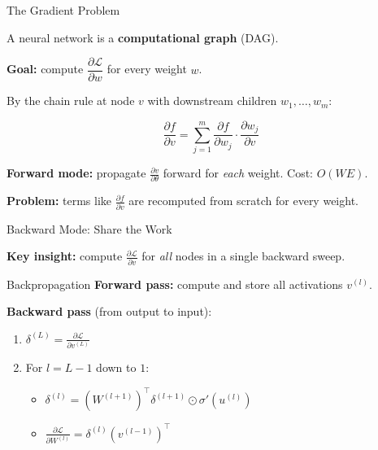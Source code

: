 \documentclass[aspectratio=169, professionalfonts]{beamer}
\begin{document}
\begin{frame}{The Gradient Problem}

A neural network is a \textbf{computational graph} (DAG).

\bigskip

\textbf{Goal:} compute $\dfrac{\partial\mathcal{L}}{\partial w}$
for every weight $w$.

\bigskip

By the chain rule at node $v$ with downstream children $w_1,\dots,w_m$:

$$\frac{\partial f}{\partial v}
  = \sum_{j=1}^{m}
    \frac{\partial f}{\partial w_j}\cdot
    \frac{\partial w_j}{\partial v}$$

\bigskip

\textbf{Forward mode:} propagate $\frac{\partial v}{\partial\theta}$
forward for \emph{each} weight. Cost: $O(WE)$.

\textbf{Problem:} terms like $\frac{\partial f}{\partial v}$ are
recomputed from scratch for every weight.

\end{frame}

\begin{frame}{Backward Mode: Share the Work}

\textbf{Key insight:} compute $\frac{\partial\mathcal{L}}{\partial v}$
for \emph{all} nodes in a single backward sweep.

\bigskip

\begin{block}{Backpropagation}
\textbf{Forward pass:} compute and store all activations $v^{(l)}$.

\textbf{Backward pass} (from output to input):
\begin{enumerate}
  \item $\delta^{(L)} = \frac{\partial\mathcal{L}}{\partial v^{(L)}}$
  \item For $l = L{-}1$ down to $1$:
  \begin{itemize}
    \item $\delta^{(l)}
      = (W^{(l+1)})^\top\delta^{(l+1)} \odot \sigma'(u^{(l)})$
    \item $\frac{\partial\mathcal{L}}{\partial W^{(l)}}
      = \delta^{(l)}(v^{(l-1)})^\top$
  \end{itemize}
\end{enumerate}
\end{block}

\end{frame}
\end{document}
